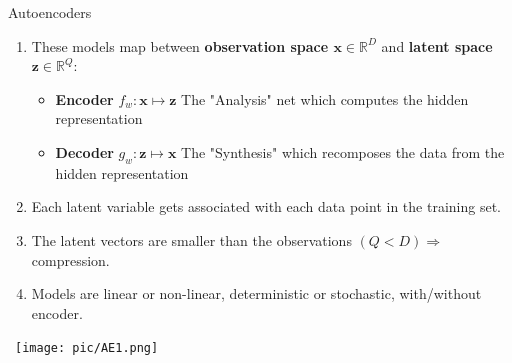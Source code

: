\documentclass[serif, aspectratio=169]{beamer}
\begin{document}
\begin{frame}{Autoencoders}
    \begin{enumerate}
        \item These models map between \textbf{\textcolor{deepblue}{observation space $\mathbf{x} \in \mathbb{R}^D$}} and \textbf{\textcolor{deepblue}{latent space $\mathbf{z} \in \mathbb{R}^Q$}}:
        
        \begin{itemize}
            \item \textbf{\textcolor{deepblue}{Encoder}} \quad \( f_w  :  \mathbf{x} \mapsto \mathbf{z} \)   \hspace{em} {\tiny{The "Analysis" net which computes the hidden representation}}
            \item \textbf{\textcolor{deepblue}{Decoder}} \quad \( g_w : \mathbf{z} \mapsto \mathbf{x} \)   \hspace{em} {\tiny{The "Synthesis" which recomposes the data from the hidden representation}}
        \end{itemize}
        
        \vspace{0.3cm}

        \item Each latent variable gets associated with each data point in the training set.
        \item The latent vectors are smaller than the observations \((Q < D) \Rightarrow\) compression.
        \item Models are linear or non-linear, deterministic or stochastic, with/without encoder.
    \end{enumerate}
    
    
    \begin{center}
\        \texttt{[image: pic/AE1.png]}\
    \end{center}
\end{frame}
\end{document}
